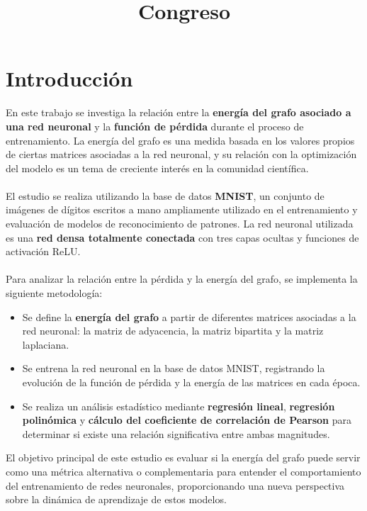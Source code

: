 \documentclass{article}
\title{Congreso}
\author{ }
\date{}
\begin{document}
\maketitle

\section{Introducción}

En este trabajo se investiga la relación entre la \textbf{energía del grafo asociado a una red neuronal} y la \textbf{función de pérdida} durante el proceso de entrenamiento. La energía del grafo es una medida basada en los valores propios de ciertas matrices asociadas a la red neuronal, y su relación con la optimización del modelo es un tema de creciente interés en la comunidad científica.\\
\\
El estudio se realiza utilizando la base de datos \textbf{MNIST}, un conjunto de imágenes de dígitos escritos a mano ampliamente utilizado en el entrenamiento y evaluación de modelos de reconocimiento de patrones. La red neuronal utilizada es una \textbf{red densa totalmente conectada} con tres capas ocultas y funciones de activación ReLU.\\
\\
Para analizar la relación entre la pérdida y la energía del grafo, se implementa la siguiente metodología:

\begin{itemize}
    \item Se define la \textbf{energía del grafo} a partir de diferentes matrices asociadas a la red neuronal: la matriz de adyacencia, la matriz bipartita y la matriz laplaciana.
    \item Se entrena la red neuronal en la base de datos MNIST, registrando la evolución de la función de pérdida y la energía de las matrices en cada época.
    \item Se realiza un análisis estadístico mediante \textbf{regresión lineal}, \textbf{regresión polinómica} y \textbf{cálculo del coeficiente de correlación de Pearson} para determinar si existe una relación significativa entre ambas magnitudes.
\end{itemize}

El objetivo principal de este estudio es evaluar si la energía del grafo puede servir como una métrica alternativa o complementaria para entender el comportamiento del entrenamiento de redes neuronales, proporcionando una nueva perspectiva sobre la dinámica de aprendizaje de estos modelos.
\end{document}
